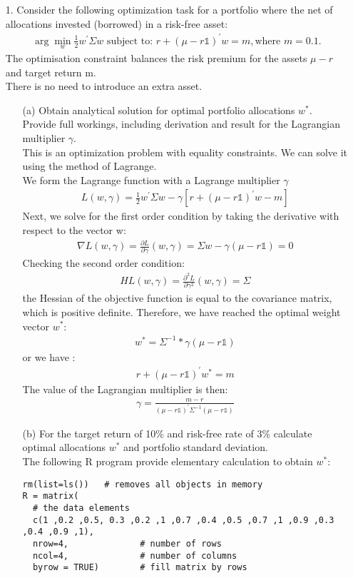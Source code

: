 \documentclass[11pt,oneside,a4paper, titlepage]{article}
\begin{document}
\begin{enumerate}
\item [1.] Consider the following optimization task for a portfolio where the net of allocations invested (borrowed) in a risk-free asset:
\begin{eqnarray*}
\arg\min_{w} \frac{1}{2}w^{'}\Sigma w \text{ subject to: }  r+(\mu-r\mathds{1})^{'}w=m, \text{where }  m=0.1.
\end{eqnarray*}
The optimisation constraint balances the risk premium for the assets \(\mu-r\) and target return m.\\
There is no need to introduce an extra asset.
\begin{enumerate}
\item [(a)] Obtain analytical solution for optimal portfolio allocations \(w^{*}\). Provide full workings, including derivation and result for the Lagrangian multiplier \(\gamma\).\\
This is an optimization problem with equality constraints. We can solve it
using the method of Lagrange.\\
We form the Lagrange function with a Lagrange multiplier \(\gamma\) 
\begin{eqnarray*}
L(w, \gamma)= \frac{1}{2}w^{'}\Sigma w -\gamma [r+(\mu-r\mathds{1})^{'}w-m]
\end{eqnarray*}
Next, we solve for the first order condition by taking the derivative with respect to the vector w:
\begin{eqnarray*}
\nabla L(w, \gamma)=\frac{\partial L}{\partial \gamma}(w, \gamma)= \Sigma w - \gamma (\mu-r\mathds{1})=0
\end{eqnarray*}
Checking the second order condition: 
\begin{eqnarray*}
HL(w, \gamma)=\frac{\partial ^2L}{\partial \gamma^2}(w, \gamma)= \Sigma
\end{eqnarray*}
the Hessian of the objective function is
equal to the covariance matrix, which is positive definite. Therefore, we have
reached the optimal weight vector \(w^*\):
\begin{eqnarray*}
w^{*}=\Sigma^{-1}*\gamma(\mu-r\mathds{1})
\end{eqnarray*}
or we have :
\begin{eqnarray*}
r+(\mu-r\mathds{1})^{'}w^{*} = m
\end{eqnarray*}
The value of the Lagrangian multiplier is then:
\begin{eqnarray*}
\gamma=\frac{m-r}{(\mu-r\mathds{1})^{'}\Sigma^{-1}(\mu-r\mathds{1})}
\end{eqnarray*}
\item [(b)] For the target return of 10\% and risk-free rate of 3\% calculate optimal allocations \(w^*\) and portfolio standard deviation.\\
The following R program provide elementary calculation to obtain \(w^*\):
\begin{verbatim}
rm(list=ls())   # removes all objects in memory
R = matrix( 
  # the data elements 
  c(1 ,0.2 ,0.5, 0.3 ,0.2 ,1 ,0.7 ,0.4 ,0.5 ,0.7 ,1 ,0.9 ,0.3 ,0.4 ,0.9 ,1),
  nrow=4,              # number of rows 
  ncol=4,              # number of columns 
  byrow = TRUE)        # fill matrix by rows 



\end{verbatim}
\end{enumerate}
\end{enumerate}
\end{document}
